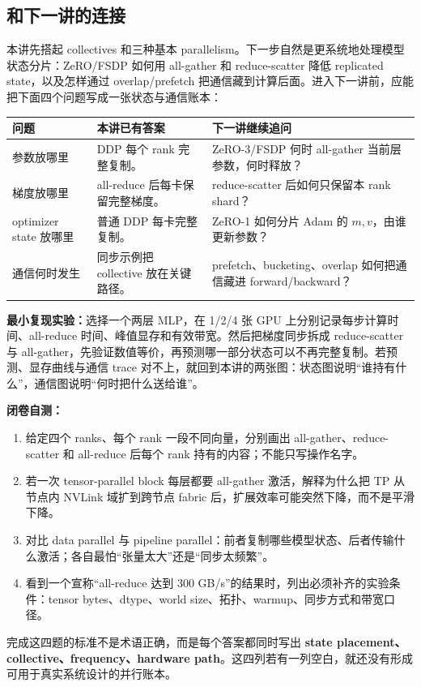 \documentclass[a4paper]{article}
\begin{document}
\subsection{和下一讲的连接}

本讲先搭起 collectives 和三种基本 parallelism。下一步自然是更系统地处理模型状态分片：ZeRO/FSDP 如何用 all-gather 和 reduce-scatter 降低 replicated state，以及怎样通过 overlap/prefetch 把通信藏到计算后面。进入下一讲前，应能把下面四个问题写成一张状态与通信账本：

\begin{center}
\begin{tabular}{L{0.2\textwidth}L{0.28\textwidth}L{0.38\textwidth}}
\toprule
问题 & 本讲已有答案 & 下一讲继续追问 \\
\midrule
参数放哪里 & DDP 每个 rank 完整复制。 & ZeRO-3/FSDP 何时 all-gather 当前层参数，何时释放？ \\
梯度放哪里 & all-reduce 后每卡保留完整梯度。 & reduce-scatter 后如何只保留本 rank shard？ \\
optimizer state 放哪里 & 普通 DDP 每卡完整复制。 & ZeRO-1 如何分片 Adam 的 \(m,v\)，由谁更新参数？ \\
通信何时发生 & 同步示例把 collective 放在关键路径。 & prefetch、bucketing、overlap 如何把通信藏进 forward/backward？ \\
\bottomrule
\end{tabular}
\end{center}

\textbf{最小复现实验：}选择一个两层 MLP，在 1/2/4 张 GPU 上分别记录每步计算时间、all-reduce 时间、峰值显存和有效带宽。然后把梯度同步拆成 reduce-scatter 与 all-gather，先验证数值等价，再预测哪一部分状态可以不再完整复制。若预测、显存曲线与通信 trace 对不上，就回到本讲的两张图：状态图说明“谁持有什么”，通信图说明“何时把什么送给谁”。

\textbf{闭卷自测：}
\begin{enumerate}
    \item 给定四个 ranks、每个 rank 一段不同向量，分别画出 all-gather、reduce-scatter 和 all-reduce 后每个 rank 持有的内容；不能只写操作名字。
    \item 若一次 tensor-parallel block 每层都要 all-gather 激活，解释为什么把 TP 从节点内 NVLink 域扩到跨节点 fabric 后，扩展效率可能突然下降，而不是平滑下降。
    \item 对比 data parallel 与 pipeline parallel：前者复制哪些模型状态、后者传输什么激活；各自最怕“张量太大”还是“同步太频繁”。
    \item 看到一个宣称“all-reduce 达到 300 GB/s”的结果时，列出必须补齐的实验条件：tensor bytes、dtype、world size、拓扑、warmup、同步方式和带宽口径。
\end{enumerate}

完成这四题的标准不是术语正确，而是每个答案都同时写出 \textbf{state placement、collective、frequency、hardware path}。这四列若有一列空白，就还没有形成可用于真实系统设计的并行账本。
\end{document}
